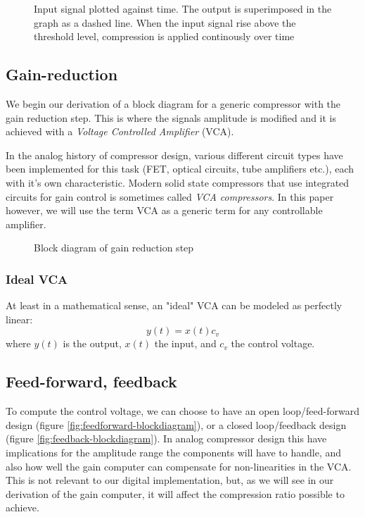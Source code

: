 \documentclass[]{article}
\begin{document}
\begin{figure}[ht]
\centering

\caption{Input signal plotted against time. The output is superimposed in the graph as a dashed line. When the input signal rise above the threshold level, compression is applied continously over time } 
\label{fig:envelope-graph}
\end{figure}


\subsection{Gain-reduction}
We begin our derivation of a block diagram for a generic compressor with the gain reduction step. This is where the signals amplitude is modified and it is achieved with a \emph{Voltage Controlled Amplifier} (VCA).

In the analog history of compressor design, various different circuit types have been implemented for this task (FET, optical circuits, tube amplifiers etc.), each with it's own characteristic. Modern solid state compressors that use integrated circuits for gain control is sometimes called \emph{VCA compressors}. In this paper however, we will use the term VCA as a generic term for any controllable amplifier.

\begin{figure}[ht]
\centering

\caption{Block diagram of gain reduction step} 
\label{fig:vca-generic-blockdiagram}
\end{figure}

\subsubsection{Ideal VCA}
At least in a mathematical sense, an "ideal" VCA can be modeled as perfectly linear:
\begin{equation}
	y(t) = x(t) c_v
\end{equation}
where $y(t)$ is the output, $x(t)$ the input, and $c_v$ the control voltage.

\subsection{Feed-forward, feedback}
To compute the control voltage, we can choose to have an open loop/feed-forward design (figure \ref{fig:feedforward-blockdiagram}), or a closed loop/feedback design (figure \ref{fig:feedback-blockdiagram}). In analog compressor design this have implications for the amplitude range the components will have to handle, and also how well the gain computer can compensate for non-linearities in the VCA. This is not relevant to our digital implementation, but, as we will see in our derivation of the gain computer, it will affect the compression ratio possible to achieve.
\end{document}
